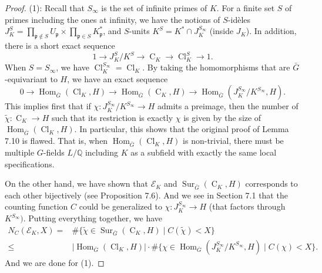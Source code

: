 \documentclass{amsart}
\numberwithin{equation}{section}
\theoremstyle{plain}
\theoremstyle{definition}
\theoremstyle{remark}
\begin{document}
\begin{proof}
	(1):
	Recall that $S_{\infty}$ is the set of infinite primes of $K$.
	For a finite set $S$ of primes including the ones at infinity, we have the notions of $S$-id{\`e}les $J_K^{S}=\prod_{\mathfrak{p}\notin S}U_{\mathfrak{p}}\times\prod_{\mathfrak{p}\in S}K_{\mathfrak{p}}^*$, and $S$-units $K^{S}=K^*\cap J_K^{S_\infty}$ (inside $J_K$).
	In addition, there is a short exact sequence
	\begin{equation*}
		1\to J_K^{S}/K^S\to\operatorname{C}_K\to\operatorname{Cl}_K^S\to1.
	\end{equation*}
	When $S=S_{\infty}$, we have $\operatorname{Cl}_K^{S_\infty}=\operatorname{Cl}_K$.
	By taking the homomorphisms that are $\bar{G}$-equivariant to $H$, we have an exact sequence
	\begin{equation*}
		0\to\operatorname{Hom}_{\bar{G}}(\operatorname{Cl}_K,H)\to\operatorname{Hom}_{\bar{G}}(\operatorname{C}_K,H)\to\operatorname{Hom}_{\bar{G}}(J_K^{S_{\infty}}/K^{S_{\infty}},H).
	\end{equation*}
	This implies first that if $\chi:J_K^{S_{\infty}}/K^{S_{\infty}}\to H$ admits a preimage, then the number of $\tilde{\chi}:\operatorname{C}_K\to H$ such that its restriction is exactly $\chi$ is given by the size of $\operatorname{Hom}_{\bar{G}}(\operatorname{Cl}_K,H)$.
	In particular, this shows that the original proof of Lemma 7.10 is flawed.
	That is, when $\operatorname{Hom}_{\bar{G}}(\operatorname{Cl}_K,H)$ is non-trivial, there must be multiple $G$-fields $L/\mathbb{Q}$ including $K$ as a subfield with exactly the same local specifications.
	
	On the other hand, we have shown that $\mathcal{E}_K$ and $\operatorname{Sur}_{\bar{G}}(\operatorname{C}_K,H)$ corresponds to each other bijectively (see Proposition 7.6).
	And we see in Section 7.1 that the counting function $C$ could be generalized to $\chi:J_K^{S_{\infty}}\to H$ (that factors through $K^{S_{\infty}})$.
	Putting everything together, we have
	\begin{equation*}
		\begin{aligned}
			N_C(\mathcal{E}_K,X)=&\#\{\tilde{\chi}\in\operatorname{Sur}_{\bar{G}}(\operatorname{C}_K,H)\mid C(\tilde{\chi})<X\}
			\\
			\leq&\lvert\operatorname{Hom}_{\bar{G}}(\operatorname{Cl}_K,H)\rvert\cdot\#\{\chi\in\operatorname{Hom}_{\bar{G}}(J_K^{S_{\infty}}/K^{S_{\infty}}, H)\mid C(\chi)<X\}.
		\end{aligned}
	\end{equation*}
	And we are done for (1).
	

\end{proof}
\end{document}
